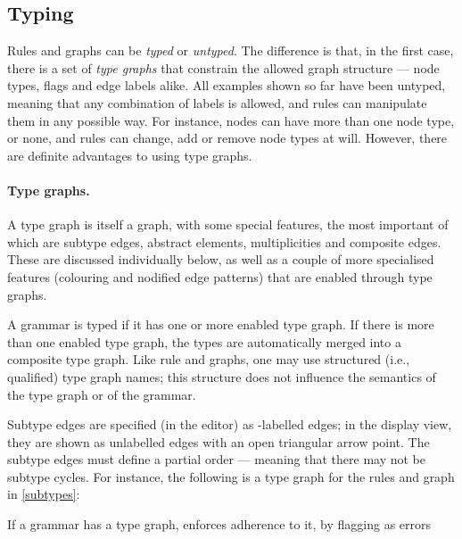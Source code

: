\subsection{Typing}

Rules and graphs can be \emph{typed} or \emph{untyped}. The difference is that,
in the first case, there is a set of \emph{type graphs} that constrain the
allowed graph structure --- node types, flags and edge labels alike. All
examples shown so far have been untyped, meaning that any combination of labels
is allowed, and rules can manipulate them in any possible way. For instance,
nodes can have more than one node type, or none, and rules can change, add or
remove node types at will. However, there are definite advantages to using type
graphs.

\paragraph{Type graphs.}

A type graph is itself a graph, with some special features, the most important
of which are subtype edges, abstract elements, multiplicities and composite
edges. These are discussed individually below, as well as a couple of more
specialised features (colouring and nodified edge patterns) that are enabled
through type graphs.

A grammar is typed if it has one or more enabled type graph. If there is more
than one enabled type graph, the types are automatically merged into a
composite type graph. Like rule and graphs, one may use structured (i.e.,
qualified) type graph names; this structure does not influence the semantics of
the type graph or of the grammar.

Subtype edges are specified (in the editor) as \subP-labelled edges; in
the display view, they are shown as unlabelled edges with an open triangular
arrow point. The subtype edges must define a partial order --- meaning that
there may not be subtype cycles. For instance, the following is a type graph
for the rules and graph in \eqref{subtypes}:

%
If a grammar has a type graph, \GROOVE enforces adherence to it, by flagging as
errors

